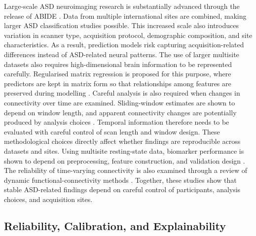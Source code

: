 Large-scale ASD neuroimaging research is substantially advanced through the release of ABIDE \citep{DiMartinoetal2014}. Data from multiple international sites are combined, making larger ASD classification studies possible. This increased scale also introduces variation in scanner type, acquisition protocol, demographic composition, and site characteristics. As a result, prediction models risk capturing acquisition-related differences instead of ASD-related neural patterns. The use of larger multisite datasets also requires high-dimensional brain information to be represented carefully. Regularised matrix regression is proposed for this purpose, where predictors are kept in matrix form so that relationships among features are preserved during modelling \citep{ZhouLi2014}. Careful analysis is also required when changes in connectivity over time are examined. Sliding-window estimates are shown to depend on window length, and apparent connectivity changes are potentially produced by analysis choices \citep{LeonardiVanDeVille2015}. Temporal information therefore needs to be evaluated with careful control of scan length and window design. These methodological choices directly affect whether findings are reproducible across datasets and sites. Using multisite resting-state data, biomarker performance is shown to depend on preprocessing, feature construction, and validation design \citep{Abrahametal2017}. The reliability of time-varying connectivity is also examined through a review of dynamic functional-connectivity methods \citep{Pretietal2017}. Together, these studies show that stable ASD-related findings depend on careful control of participants, analysis choices, and acquisition sites.

\subsection{Reliability, Calibration, and Explainability}

